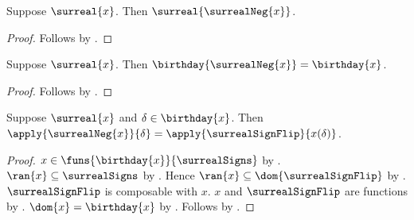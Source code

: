 \begin{corollary}\label{surreal_negation_is_surreal}
    Suppose $\surreal{x}$.
    Then $\surreal{\surrealNeg{x}}$.
\end{corollary}
\begin{proof}
    Follows by .
\end{proof}

\begin{corollary}\label{surreal_negation_birthday}
    Suppose $\surreal{x}$.
    Then $\birthday{\surrealNeg{x}}=\birthday{x}$.
\end{corollary}
\begin{proof}
    Follows by .
\end{proof}

\begin{proposition}\label{surreal_negation_value}
    Suppose $\surreal{x}$ and $\delta\in\birthday{x}$.
    Then $\apply{\surrealNeg{x}}{\delta}=
        \apply{\surrealSignFlip}{x(\delta)}$.
\end{proposition}
\begin{proof}
    $x\in\funs{\birthday{x}}{\surrealSigns}$
        by .
    $\ran{x}\subseteq\surrealSigns$
        by .
    Hence $\ran{x}\subseteq\dom{\surrealSignFlip}$
        by .
    $\surrealSignFlip$ is composable with $x$.
    $x$ and $\surrealSignFlip$ are functions
        by .
    $\dom{x}=\birthday{x}$ by .
    Follows by .
\end{proof}

